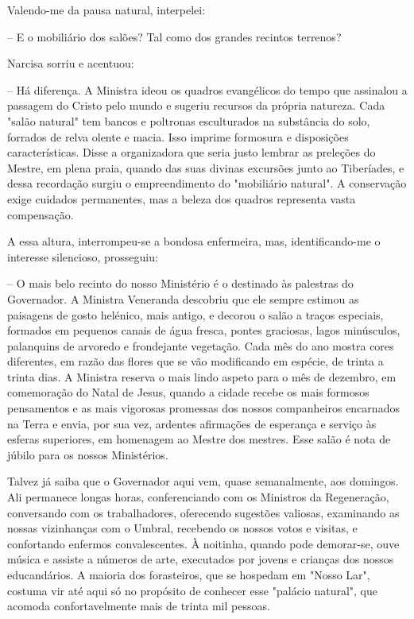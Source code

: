 \documentclass[portuguese,12pt,a4paper]{scrbook}
\begin{document}
	Valendo-me da pausa natural, interpelei:
	
	– E o mobiliário dos salões? Tal como dos grandes recintos terrenos?
	
	Narcisa sorriu e acentuou:
	
	– Há diferença. A Ministra ideou os quadros evangélicos do tempo que assinalou a passagem do Cristo pelo mundo e sugeriu recursos da própria natureza. Cada "salão natural" tem bancos e poltronas esculturados na substância do solo, forrados de relva olente e macia. Isso imprime formosura e disposições características. Disse a organizadora que seria justo lembrar as preleções do Mestre, em plena praia, quando das suas divinas excursões junto ao Tiberíades, e dessa recordação surgiu o empreendimento do "mobiliário natural". A conservação exige cuidados permanentes, mas a beleza dos quadros representa vasta compensação.
	
	A essa altura, interrompeu-se a bondosa enfermeira, mas, identificando-me o interesse silencioso, prosseguiu:
	
	
	– O mais belo recinto do nosso Ministério é o destinado às palestras do Governador. A Ministra Veneranda descobriu que ele sempre estimou as paisagens de gosto helénico, mais antigo, e decorou o salão a traços especiais, formados em pequenos canais de água fresca, pontes graciosas, lagos minúsculos, palanquins de arvoredo e frondejante vegetação. Cada mês do ano mostra cores diferentes, em razão das flores que se vão modificando em espécie, de trinta a trinta dias. A Ministra reserva o mais lindo aspeto para o mês de dezembro, em comemoração do Natal de Jesus, quando a cidade recebe os mais formosos pensamentos e as mais vigorosas promessas dos nossos companheiros encarnados na Terra e envia, por sua vez, ardentes afirmações de esperança e serviço às esferas superiores, em homenagem ao Mestre dos mestres. Esse salão é nota de júbilo para os nossos Ministérios.
	
	Talvez já saiba que o Governador aqui vem, quase semanalmente, aos domingos. Ali permanece longas horas, conferenciando com os Ministros da Regeneração, conversando com os trabalhadores, oferecendo sugestões valiosas, examinando as nossas vizinhanças com o Umbral, recebendo os nossos votos e visitas, e confortando enfermos convalescentes. À noitinha, quando pode demorar-se, ouve música e assiste a números de arte, executados por jovens e crianças dos nossos educandários. A maioria dos forasteiros, que se hospedam em "Nosso Lar", costuma vir até aqui só no propósito de conhecer esse "palácio natural", que acomoda confortavelmente mais de trinta mil pessoas.
	
\end{document}
